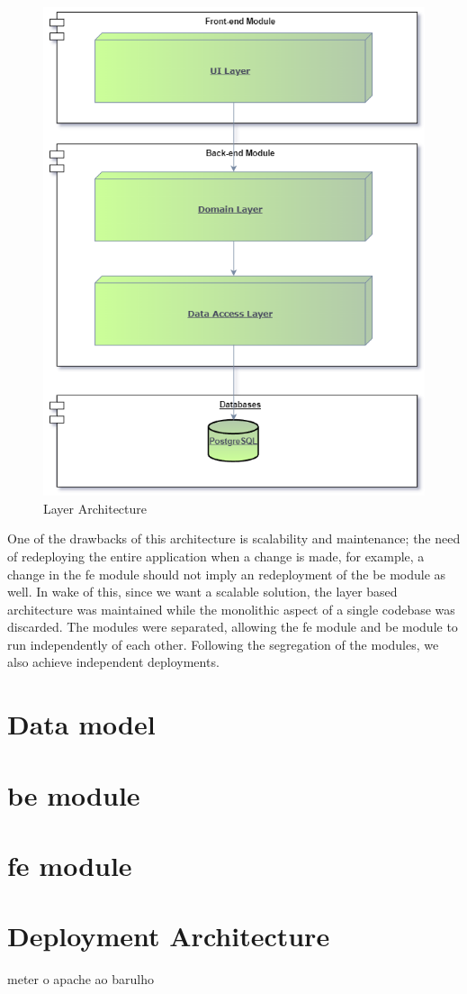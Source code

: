 \begin{figure}[H]
    \centering
    \includegraphics[scale=0.5]{Chapters/img/architecture/arch-layers.png}
    \caption{Layer Architecture}
    \label{fig:layer-arch}
\end{figure}

One of the drawbacks of this architecture is scalability and maintenance; the need of redeploying the entire application when a change is made, for example, a change in the \acrlong{fe} module should not imply an redeployment of the \acrlong{be} module as well. 
In wake of this, since we want a scalable solution, the layer based architecture was maintained while the monolithic aspect of a single codebase was discarded.
The modules were separated, allowing the \acrlong{fe} module and \acrlong{be} module to run independently of each other. Following the segregation of the modules, we also achieve independent deployments.

\section{Data model}


\section{\acrlong{be} module}

\section{\acrlong{fe} module}

\section{Deployment Architecture}
meter o apache ao barulho